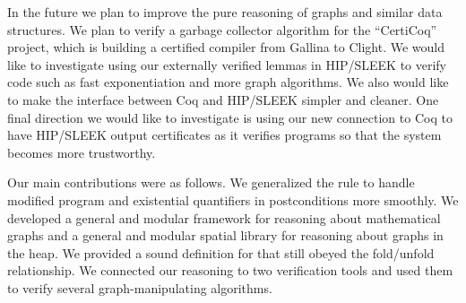 In the future we plan to improve the pure reasoning of graphs and
similar data structures.  We plan to verify a garbage
collector algorithm for the ``CertiCoq'' project, which is building 
a certified compiler from Gallina to Clight. We would like to investigate
using our externally verified lemmas in HIP/SLEEK to verify code such as fast
exponentiation and more graph algorithms. We also would like to make
the interface between Coq and HIP/SLEEK simpler and cleaner.
One final direction we would like to investigate is using our new
connection to Coq to have HIP/SLEEK output certificates as it 
verifies programs so that the system becomes more trustworthy.

Our main contributions were as follows.  We generalized the 
rule to handle modified program and existential quantifiers in postconditions
more smoothly.  We developed a general and modular framework for reasoning
about mathematical graphs and a general and modular spatial library for
reasoning about graphs in the heap.  We provided a sound definition for 
that still obeyed the fold/unfold relationship.  We connected our reasoning
to two verification tools and used them to verify several graph-manipulating algorithms.
